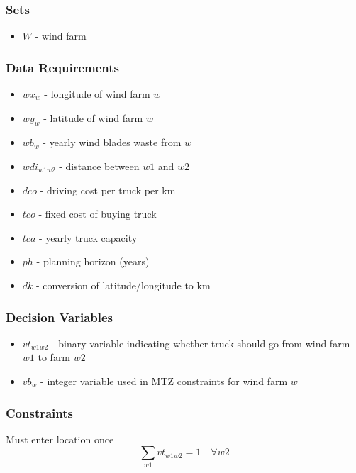 \subsubsection{Sets}
\begin{itemize} [noitemsep]
    \item $W$ - wind farm
\end{itemize}


\subsubsection{Data Requirements}
\begin{multicols}{2}
\begin{itemize} [noitemsep]
    \item $wx_{w}$ - longitude of wind farm $w$
    \item $wy_{w}$ - latitude of wind farm $w$ 
    \item $wb_{w}$ - yearly wind blades waste from $w$ 
    \item $wdi_{w1w2}$ - distance between $w1$ and $w2$ 
    \item $dco$ - driving cost per truck per km 
    \item $tco$ - fixed cost of buying truck 
    \item $tca$ - yearly truck capacity 
    \item $ph$ - planning horizon (years) 
    \item $dk$ - conversion of latitude/longitude to km
\end{itemize} 
\end{multicols}



\subsubsection{Decision Variables} 
\begin{itemize} [noitemsep]
    \item $vt_{w1w2}$ - binary variable indicating whether truck should go from wind farm $w1$ to farm $w2$
    \item $vb_{w}$ - integer variable used in MTZ constraints for wind farm $w$ 
\end{itemize}


\subsubsection{Constraints}
Must enter location once
\vspace{-5pt}
\begin{equation}
    \sum_{w1} vt_{w1w2} = 1 \quad \forall w2
\end{equation}

